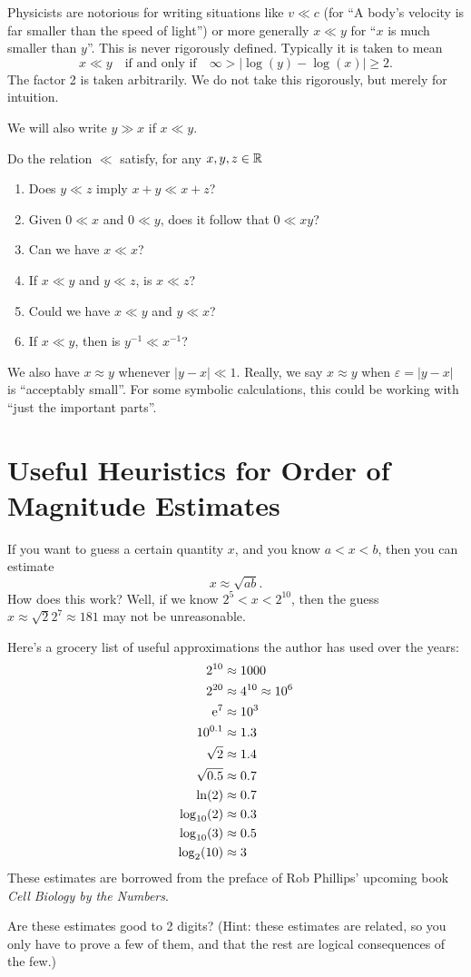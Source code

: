 Physicists are notorious for writing situations like $v\ll c$ (for ``A
body's velocity is far smaller than the speed of light'') or more
generally $x\ll y$ for ``$x$ is much smaller than $y$''. This is never
rigorously defined. Typically it is taken to mean
\begin{equation}
x\ll y\quad\mbox{if and only if}\quad \infty>|\log(y)-\log(x)|\geq2.
\end{equation}
The factor 2 is taken arbitrarily. We do not take this rigorously, but
merely for intuition.

We will also write $y\gg x$ if $x\ll y$.

 Do the relation $\ll$ satisfy, for any $x,y,z\in\mathbb{R}$
\begin{enumerate}
\item Does $y\ll z$ imply $x+y\ll x+z$?
\item Given $0\ll x$ and $0\ll y$, does it follow that $0\ll xy$?
\item Can we have $x\ll x$?
\item If $x\ll y$ and $y\ll z$, is $x\ll z$?
\item Could we have $x\ll y$ and $y\ll x$?
\item If $x\ll y$, then is $y^{-1}\ll x^{-1}$?
\end{enumerate}

We also have $x\approx y$ whenever $|y-x|\ll1$.
Really, we say $x\approx y$ when $\varepsilon=|y-x|$ is ``acceptably
small''. For some symbolic calculations, this could be working with
``just the important parts''.

\section{Useful Heuristics for Order of Magnitude Estimates}

If you want to guess a certain quantity $x$, and you know $a<x<b$, then
you can estimate
\begin{equation}
x\approx\sqrt{ab}.
\end{equation}
How does this work? Well, if we know $2^{5}<x<2^{10}$, then the guess
$x\approx \sqrt{2}2^{7}\approx 181$ may not be unreasonable.

Here's a grocery list of useful approximations the author has used over
the years:
\begin{align}
2^{10} &\approx 1000\\
2^{20} &\approx 4^{10}\approx 10^{6}\\
\mathrm{e}^{7} &\approx 10^{3}\\
10^{0.1} &\approx 1.3\\
\sqrt{2} &\approx 1.4\\
\sqrt{0.5} & \approx 0.7\\
\ln(2) &\approx 0.7\\
\log_{10}(2) &\approx 0.3\\
\log_{10}(3) &\approx 0.5\\
\log_{2}(10) &\approx 3
\end{align}
These estimates are borrowed from the preface of Rob Phillips' upcoming
book \emph{Cell Biology by the Numbers}.

\begin{xca}
Are these estimates good to 2 digits? (Hint: these estimates are
related, so you only have to prove a few of them, and that the rest are
logical consequences of the few.)
\end{xca}

